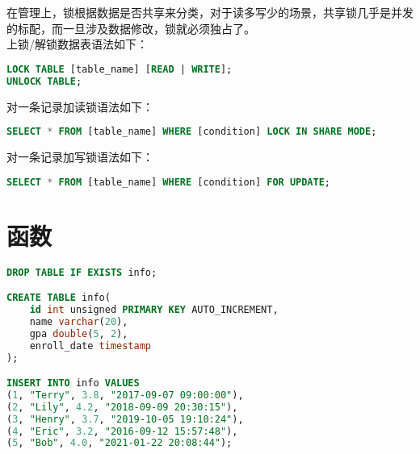 \documentclass[12pt, openany, oneside]{book}
\begin{document}
\begin{table}[H]
	\centering
	\caption{锁的管理分类}
\end{table}

在管理上，锁根据数据是否共享来分类，对于读多写少的场景，共享锁几乎是并发的标配，而一旦涉及数据修改，锁就必须独占了。\\

上锁/解锁数据表语法如下：

\vspace{-0.5cm}

\begin{lstlisting}[language=SQL]
LOCK TABLE [table_name] [READ | WRITE];
UNLOCK TABLE;
\end{lstlisting}

对一条记录加读锁语法如下：

\vspace{-0.5cm}

\begin{lstlisting}[language=SQL]
SELECT * FROM [table_name] WHERE [condition] LOCK IN SHARE MODE;
\end{lstlisting}

对一条记录加写锁语法如下：

\vspace{-0.5cm}

\begin{lstlisting}[language=SQL]
SELECT * FROM [table_name] WHERE [condition] FOR UPDATE;
\end{lstlisting}

\newpage

\chapter{函数}

\vspace{0.5cm}


\begin{lstlisting}[language=SQL]
DROP TABLE IF EXISTS info;

CREATE TABLE info(
    id int unsigned PRIMARY KEY AUTO_INCREMENT,
    name varchar(20),
    gpa double(5, 2),
    enroll_date timestamp
);

INSERT INTO info VALUES
(1, "Terry", 3.8, "2017-09-07 09:00:00"),
(2, "Lily", 4.2, "2018-09-09 20:30:15"),
(3, "Henry", 3.7, "2019-10-05 19:10:24"),
(4, "Eric", 3.2, "2016-09-12 15:57:48"),
(5, "Bob", 4.0, "2021-01-22 20:08:44");
\end{lstlisting}
\end{document}
